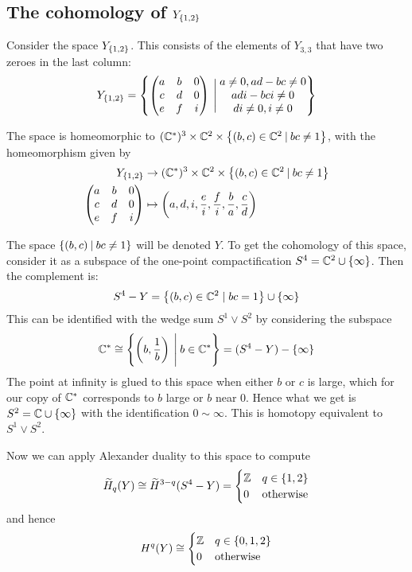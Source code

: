 \subsection{The cohomology of $Y_{\left\{ 1,2 \right\}}$}

Consider the space $Y_{\left\{ 1,2 \right\}}$. This consists of the elements of
$Y_{3,3}$ that have two zeroes in the last column:
\[ Y_{\left\{ 1,2 \right\}} = \left\{ 
  \begin{pmatrix}
    a & b & 0 \\
    c & d & 0 \\
    e & f & i
  \end{pmatrix} \:\Bigg\vert\:
  \begin{matrix}
    a \neq 0, ad-bc \neq 0 \\
    adi-bci \neq 0 \\
    di \neq 0, i \neq 0
  \end{matrix}
 \right\} \]

The space is homeomorphic to $(\mathbb{C}^*)^3\times \mathbb{C}^2
\times \left\{ (b,c)\in\mathbb{C}^2 \: \vert \: bc\neq 1 \right\}$, with the
homeomorphism given by
\begin{align*}
  Y_{\left\{ 1,2 \right\}} &\to (\mathbb{C}^*)^3\times \mathbb{C}^2
  \times \left\{ (b,c)\in\mathbb{C}^2 \: \vert \: bc\neq 1 \right\} \\
  \begin{pmatrix}
    a & b & 0 \\
    c & d & 0 \\
    e & f & i
  \end{pmatrix} &\mapsto \left(a,d,i,\frac{e}{i},\frac{f}{i},
    \frac{b}{a}, \frac{c}{d}\right)
\end{align*}

The space $\left\{ (b,c)\: \vert\: bc\neq 1 \right\}$ will be denoted
$Y$. To get the cohomology of this space, consider it as a subspace of
the one-point compactification $S^4 = \mathbb{C}^2\cup\left\{ \infty \right\}$. Then the
complement is:
\[ S^4-Y = \left\{ (b,c)\in \mathbb{C}^2 \mid bc=1 \right\}\cup\left\{ \infty \right\} \]
This can be identified with the wedge sum $S^1\vee S^2$ by considering
the subspace
\[ \mathbb{C}^* \cong \left\{ \left(b,\frac{1}{b} \right) \:\Bigg\vert\: b\in \mathbb{C}^* \right\} =
(S^4-Y)-\left\{ \infty \right\} \]
The point at infinity is glued to this space when either $b$ or $c$
is large, which for our copy of $\mathbb{C}^*$
corresponds to $b$ large or $b$ near 0. Hence what we get is
$S^2=\mathbb{C}\cup\left\{ \infty \right\}$ with the identification $0 \sim \infty$. This
is homotopy equivalent to $S^1\vee S^2$.

Now we can apply Alexander duality to this space to compute
\[ \widetilde H_q(Y) \cong \widetilde H^{3-q}(S^4-Y) =
\begin{cases}
  \mathbb{Z} & q \in \left\{ 1,2 \right\} \\
  0 & \text{otherwise}
\end{cases} \]
and hence
\[ H^q(Y) \cong
\begin{cases}
  \mathbb{Z} & q \in \left\{ 0,1,2 \right\} \\
  0 & \text{otherwise}
\end{cases} \]

